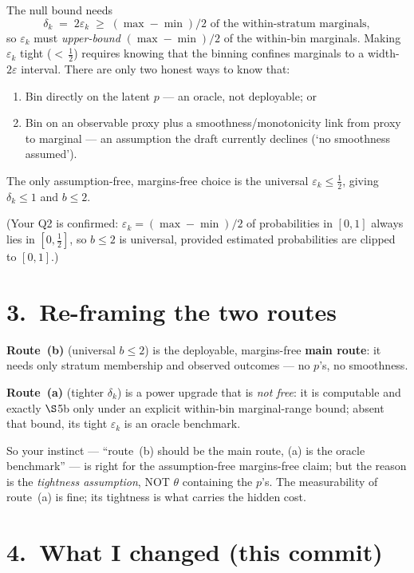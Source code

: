 \documentclass[11pt,a4paper]{article}
\begin{document}
\noindent
The null bound needs
\[
  \delta_k \;=\; 2\varepsilon_k \;\ge\; (\max - \min)/2
  \text{ of the within-stratum marginals},
\]
so $\varepsilon_k$ must \emph{upper-bound} $(\max - \min)/2$ of the within-bin
marginals.
Making $\varepsilon_k$ tight (${<}\,\tfrac12$) requires knowing that the binning
confines marginals to a width-$2\varepsilon$ interval.
There are only two honest ways to know that:
\begin{enumerate}
  \item[(a)] Bin directly on the latent $p$ --- an oracle, not deployable; or
  \item[(b)] Bin on an observable proxy plus a smoothness/mono\-tonicity link
    from proxy to marginal --- an assumption the draft currently declines
    (`no smoothness assumed').
\end{enumerate}
The only assumption-free, margins-free choice is the universal
$\varepsilon_k \le \tfrac12$, giving $\delta_k \le 1$ and $b \le 2$.

(Your Q2 is confirmed: $\varepsilon_k = (\max-\min)/2$ of probabilities
in $[0,1]$ always lies in $[0,\tfrac12]$, so $b \le 2$ is universal, provided
estimated probabilities are clipped to $[0,1]$.)

\section*{3.\ Re-framing the two routes}

\noindent
\textbf{Route~(b)} (universal $b \le 2$) is the deployable, margins-free
\textbf{main route}: it needs only stratum membership and observed outcomes ---
no $p$'s, no smoothness.

\textbf{Route~(a)} (tighter $\delta_k$) is a power upgrade that is \emph{not
free}: it is computable and exactly $\S$5b only under an explicit within-bin
marginal-range bound; absent that bound, its tight $\varepsilon_k$ is an oracle
benchmark.

So your instinct --- ``route~(b) should be the main route, (a) is the oracle
benchmark'' --- is right for the assumption-free margins-free claim; but the
reason is the \emph{tightness assumption}, NOT $\theta$ containing the $p$'s.
The measurability of route~(a) is fine; its tightness is what carries the hidden
cost.

\section*{4.\ What I changed (this commit)}
\end{document}
